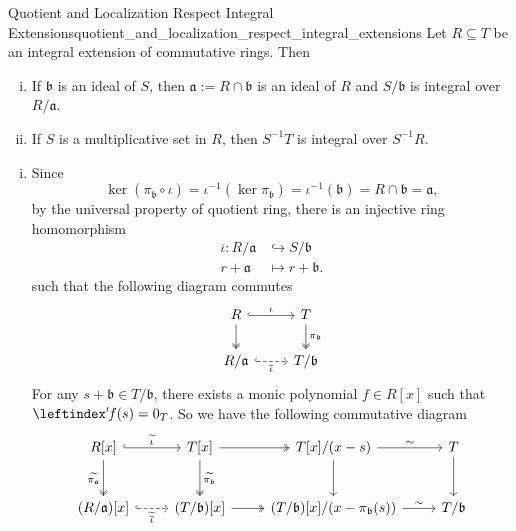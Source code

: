 \begin{proposition}{Quotient and Localization Respect Integral Extensions}{quotient_and_localization_respect_integral_extensions}
    Let $R\subseteq T$ be an integral extension of commutative rings. Then 
    \begin{enumerate}[(i)]
        \item If $\mathfrak{b}$ is an ideal of $S$, then $\mathfrak{a}:= R\cap \mathfrak{b}$ is an ideal of $R$ and $S/\mathfrak{b}$ is integral over $R/\mathfrak{a}$.
        \item If $S$ is a multiplicative set in $R$, then $S^{-1}T$ is integral over $S^{-1}R$.
    \end{enumerate}
\end{proposition}
\begin{prf}
    \begin{enumerate}[(i)]
        \item Since 
    \[
    \ker (\pi_{\mathfrak{b}}\circ \iota )= \iota^{-1}\left(\ker \pi_{\mathfrak{b}}\right)=\iota^{-1}\left(\mathfrak{b}\right)=R \cap \mathfrak{b}=\mathfrak{a},
    \]
    by the universal property of quotient ring, there is an injective ring homomorphism 
    \begin{align*}
        \overline{\iota}:R/\mathfrak{a}&\hookrightarrow S/\mathfrak{b}\\
        r+\mathfrak{a}&\longmapsto r+\mathfrak{b}.
    \end{align*} such that the following diagram commutes
    \[
        \begin{tikzcd}
            R \arrow[r, "\iota", hook] \arrow[d, two heads] & T \arrow[d, "\pi_{\mathfrak{b}}", two heads] \\
            R/\mathfrak{a} \arrow[r, "\overline{\iota}"', dashed, hook]                & T/\mathfrak{b}             
            \end{tikzcd}
    \]
    For any $s + \mathfrak{b}\in T/\mathfrak{b}$, there exists a monic polynomial $f\in R[x]$ such that $\leftindex^{\iota}\!f(s)=0_T$. So we have the following commutative diagram
    \[
        \begin{tikzcd}
            {R[x]} \arrow[r, "\widetilde{\iota}", hook] \arrow[d, "\widetilde{\pi_\mathfrak{a}}"', two heads] & {T[x]} \arrow[d, "\widetilde{\pi_\mathfrak{b}}", two heads] \arrow[r, two heads] & {T[x]/(x-s)} \arrow[d] \arrow[r, "\sim"]           & T \arrow[d]    \\[0.8em]
            {(R/\mathfrak{a})[x]} \arrow[r, "\widetilde{\overline{\iota}}"', dashed, hook]                    & {(T/\mathfrak{b})[x]} \arrow[r, two heads]                                       & {(T/\mathfrak{b})[x]/(x-\pi_{\mathfrak{b}}(s))} \arrow[r, "\sim"] & T/\mathfrak{b}

\end{tikzcd}\]
\end{enumerate}
\end{prf}
